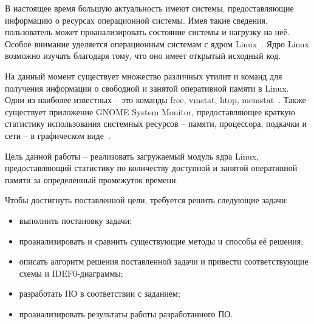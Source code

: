 
В настоящее время большую актуальность имеют системы, предоставляющие информацию о ресурсах операционной системы. Имея такие сведения, пользователь может проанализировать состояние системы и нагрузку на неё. Особое внимание уделяется операционным системам с ядром Linux~\cite{linux}. Ядро Linux возможно изучать благодаря тому, что оно имеет открытый исходный код.

На данный момент существует множество различных утилит и команд для получения информации о свободной и занятой оперативной памяти в Linux. Одни из наиболее известных -- это команды free, vmstat, htop, memstat~\cite{commands}. Также существует приложение GNOME System Monitor, предоставляющее краткую статистику использования системных ресурсов -- памяти, процессора, подкачки и сети -- в графическом виде~\cite{gnome}.

Цель данной работы – реализовать загружаемый модуль ядра Linux, предоставляющий статистику по количеству доступной и занятой оперативной памяти за определенный промежуток времени.

Чтобы достигнуть поставленной цели, требуется решить следующие задачи:
\begin{itemize}
	\item выполнить постановку задачи;
	\item проанализировать и сравнить существующие методы и способы её решения;
	\item описать алгоритм решения поставленной задачи и привести соответствующие схемы и IDEF0-диаграммы;
	\item разработать ПО в соответствии с заданием;
	\item проанализировать результаты работы разработанного ПО.
\end{itemize}